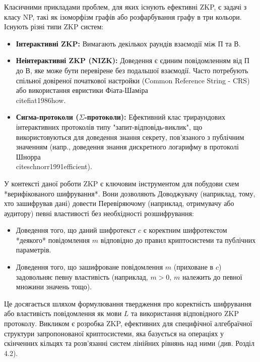 \documentclass[a4paper,12pt]{article}
\begin{document}
    Класичними прикладами проблем, для яких існують ефективні ZKP, є задачі з класу NP, такі як ізоморфізм графів або розфарбування графу в три кольори. Існують різні типи ZKP систем:
    \begin{itemize}
        \item \textbf{Інтерактивні ZKP:} Вимагають декількох раундів взаємодії між П та В.
        \item \textbf{Неінтерактивні ZKP (NIZK):} Доведення є єдиним повідомленням від П до В, яке може бути перевірене без подальшої взаємодії. Часто потребують спільної довіреної початкової настройки (Common Reference String - CRS) або використання евристики Фiата-Шамiра \\cite{fiat1986how}.
        \item \textbf{Сигма-протоколи (\(\Sigma\)-протоколи):} Ефективний клас трираундових інтерактивних протоколів типу "запит-відповідь-виклик", що використовуються для доведення знання секрету, пов'язаного з публічним значенням (напр., доведення знання дискретного логарифму в протоколі Шнорра \\cite{schnorr1991efficient}).
    \end{itemize}

    У контексті даної роботи ZKP є ключовим інструментом для побудови схем *верифікованого шифрування*. Вони дозволяють Доводжувачу (наприклад, тому, хто зашифрував дані) довести Перевіряючому (наприклад, отримувачу або аудитору) певні властивості без необхідності розшифрування:
    \begin{itemize}
        \item Доведення того, що даний шифротекст \(c\) є коректним шифротекстом *деякого* повідомлення \(m\) відповідно до правил криптосистеми та публічних параметрів.
        \item Доведення того, що зашифроване повідомлення \(m\) (приховане в \(c\)) задовольняє певну властивість (наприклад, \(m > 0\), \(m\) належить до певної множини значень тощо).
    \end{itemize}
    Це досягається шляхом формулювання твердження про коректність шифрування або властивість повідомлення як мови \(L\) та використання відповідного ZKP протоколу. Викликом є розробка ZKP, ефективних для специфічної алгебраїчної структури запропонованої криптосистеми, яка базується на операціях у скінченних кільцях та розв'язанні систем лінійних рівнянь над ними (див. Розділ 4.2).
\end{document}
